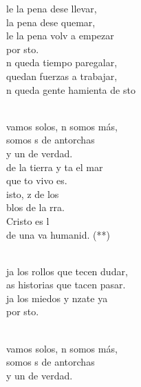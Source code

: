 \begin{cancion}%
	le la pena dese llevar,\\
	 la pena dese quemar,\\
	le la pena volv a empezar \\
	por sto. \\
\jump
	n queda tiempo paregalar, \\
	 quedan fuerzas a trabajar,\\
	n queda gente hamienta de sto\\\jump\\
	\begin{chorus}%
	 vamos solos, n somos más,\\
	somos s de antorchas \\
	y un  de verdad.\\
	de la tierra y ta el mar\\
	que to vivo es. \\
\jump
	isto, z de los \\
	blos de la rra.\\
	Cristo es l \\
	de una va humanid. (**)\\
	\end{chorus}%
	\jump\\
	ja los rollos que tecen dudar,\\
	as historias que tacen pasar.\\
	ja los miedos y nzate ya  \\
	por sto. \\\jump\\
	\begin{chorus}%
	 vamos solos, n somos más,\\
	somos s de antorchas \\
	y un  de verdad.\\

\end{chorus}
\end{cancion}
